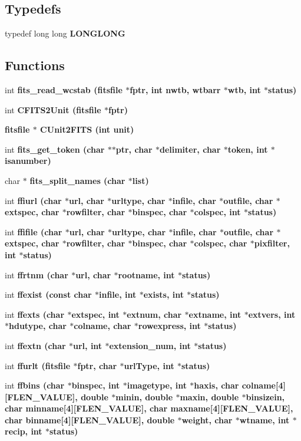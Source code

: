 \subsection*{Typedefs}
\begin{CompactItemize}
\item 
typedef long long \bf{LONGLONG}
\end{CompactItemize}
\subsection*{Functions}
\begin{CompactItemize}
\item 
int \bf{fits\_\-read\_\-wcstab} (\bf{fitsfile} $\ast$fptr, int nwtb, \bf{wtbarr} $\ast$wtb, int $\ast$status)
\item 
int \bf{CFITS2Unit} (\bf{fitsfile} $\ast$fptr)
\item 
\bf{fitsfile} $\ast$ \bf{CUnit2FITS} (int unit)
\item 
int \bf{fits\_\-get\_\-token} (char $\ast$$\ast$ptr, char $\ast$delimiter, char $\ast$token, int $\ast$isanumber)
\item 
char $\ast$ \bf{fits\_\-split\_\-names} (char $\ast$list)
\item 
int \bf{ffiurl} (char $\ast$url, char $\ast$urltype, char $\ast$infile, char $\ast$outfile, char $\ast$extspec, char $\ast$rowfilter, char $\ast$binspec, char $\ast$colspec, int $\ast$status)
\item 
int \bf{ffifile} (char $\ast$url, char $\ast$urltype, char $\ast$infile, char $\ast$outfile, char $\ast$extspec, char $\ast$rowfilter, char $\ast$binspec, char $\ast$colspec, char $\ast$pixfilter, int $\ast$status)
\item 
int \bf{ffrtnm} (char $\ast$url, char $\ast$rootname, int $\ast$status)
\item 
int \bf{ffexist} (const char $\ast$infile, int $\ast$exists, int $\ast$status)
\item 
int \bf{ffexts} (char $\ast$extspec, int $\ast$extnum, char $\ast$extname, int $\ast$extvers, int $\ast$\bf{hdutype}, char $\ast$colname, char $\ast$rowexpress, int $\ast$status)
\item 
int \bf{ffextn} (char $\ast$url, int $\ast$extension\_\-num, int $\ast$status)
\item 
int \bf{ffurlt} (\bf{fitsfile} $\ast$fptr, char $\ast$url\-Type, int $\ast$status)
\item 
int \bf{ffbins} (char $\ast$binspec, int $\ast$imagetype, int $\ast$haxis, char colname[4][FLEN\_\-VALUE], double $\ast$minin, double $\ast$maxin, double $\ast$binsizein, char minname[4][FLEN\_\-VALUE], char maxname[4][FLEN\_\-VALUE], char binname[4][FLEN\_\-VALUE], double $\ast$weight, char $\ast$wtname, int $\ast$recip, int $\ast$status)
$$
\end{CompactItemize}
